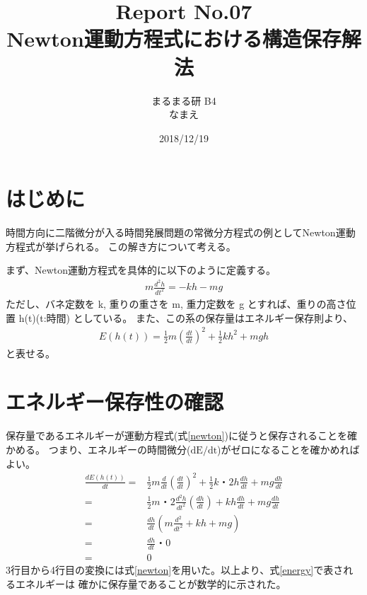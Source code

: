 \documentclass[12pt]{ltjsarticle}
\begin{document}
\begin{titlepage}
\title{Report No.07　\\ Newton運動方程式における構造保存解法}
\author{まるまる研 B4 \\ なまえ}
\date{2018/12/19}
\maketitle

\end{titlepage}

\section{はじめに}
時間方向に二階微分が入る時間発展問題の常微分方程式の例としてNewton運動方程式が挙げられる。
この解き方について考える。

まず、Newton運動方程式を具体的に以下のように定義する。
\begin{eqnarray}
    m\frac{d^2 h}{dt^2} = -kh-mg
    \label{newton}
\end{eqnarray}
ただし、バネ定数を k, 重りの重さを m, 重力定数を g とすれば、重りの高さ位置 h(t)(t:時間) としている。
また、この系の保存量はエネルギー保存則より、
\begin{eqnarray}
    E(h(t)) = \frac{1}{2}m\left(\frac{dt}{dt}\right)^2 + \frac{1}{2}kh^2 + mgh
    \label{energy}
\end{eqnarray}
と表せる。

\section{エネルギー保存性の確認}
保存量であるエネルギーが運動方程式(式\ref{newton})に従うと保存されることを確かめる。
つまり、エネルギーの時間微分($\text{dE}/\text{dt}$)がゼロになることを確かめればよい。
\begin{equation*}
    \begin{split}
    \frac{dE(h(t))}{dt} = &\frac{1}{2}m\frac{d}{dt}\left(\frac{dt}{dt}\right)^2 
    + \frac{1}{2}k・2h\frac{dh}{dt} + mg\frac{dh}{dt} \\
         = & \frac{1}{2}m・2\frac{d^2 h}{dt^2}\left(\frac{dh}{dt}\right)+kh\frac{dh}{dt}+mg\frac{dh}{dt}\\
         = & \frac{dh}{dt}\left(m\frac{d^2}{dt^2}+kh+mg\right) \\
         = & \frac{dh}{dt}・0 \\
         = & 0
\end{split}
\end{equation*}
3行目から4行目の変換には式\ref{newton}を用いた。以上より、式\ref{energy}で表されるエネルギーは
確かに保存量であることが数学的に示された。
\end{document}
